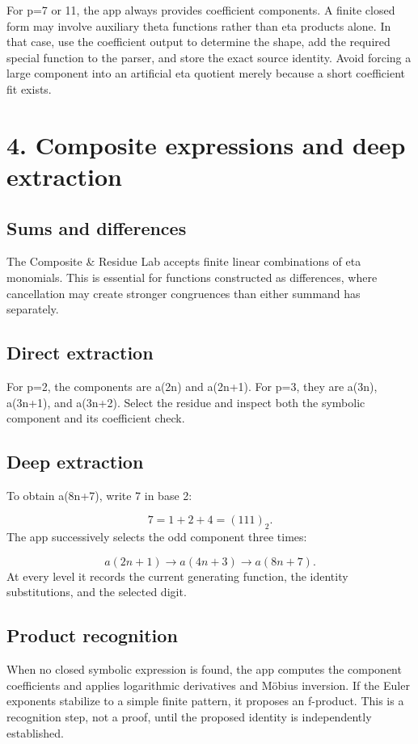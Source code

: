 \documentclass[11pt]{article}
\begin{document}
For p=7 or 11, the app always provides coefficient components. A finite closed form may involve auxiliary theta functions rather than eta products alone. In that case, use the coefficient output to determine the shape, add the required special function to the parser, and store the exact source identity. Avoid forcing a large component into an artificial eta quotient merely because a short coefficient fit exists.

\newpage
\section{4. Composite expressions and deep extraction}
\subsection*{Sums and differences}
The Composite \& Residue Lab accepts finite linear combinations of eta monomials. This is essential for functions constructed as differences, where cancellation may create stronger congruences than either summand has separately.

\subsection*{Direct extraction}
For p=2, the components are a(2n) and a(2n+1). For p=3, they are a(3n), a(3n+1), and a(3n+2). Select the residue and inspect both the symbolic component and its coefficient check.

\subsection*{Deep extraction}
To obtain a(8n+7), write 7 in base 2:

\[
7=1+2+4=(111)_2.
\]
The app successively selects the odd component three times:

\[
a(2n+1)\longrightarrow a(4n+3)\longrightarrow a(8n+7).
\]
At every level it records the current generating function, the identity substitutions, and the selected digit.

\subsection*{Product recognition}
When no closed symbolic expression is found, the app computes the component coefficients and applies logarithmic derivatives and Möbius inversion. If the Euler exponents stabilize to a simple finite pattern, it proposes an f-product. This is a recognition step, not a proof, until the proposed identity is independently established.
\end{document}
